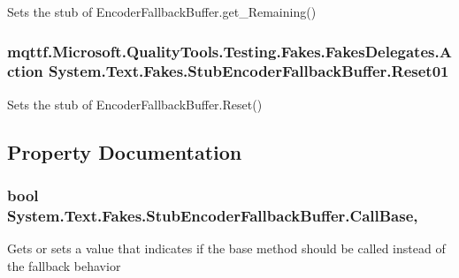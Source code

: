 Sets the stub of Encoder\-Fallback\-Buffer.\-get\-\_\-\-Remaining()

\hypertarget{class_system_1_1_text_1_1_fakes_1_1_stub_encoder_fallback_buffer_a0250622a3fcec719373cb2edc4f24772}{
\subsubsection[{Reset01}]{\setlength{\rightskip}{0pt plus 5cm}mqttf.\-Microsoft.\-Quality\-Tools.\-Testing.\-Fakes.\-Fakes\-Delegates.\-Action System.\-Text.\-Fakes.\-Stub\-Encoder\-Fallback\-Buffer.\-Reset01}}\label{class_system_1_1_text_1_1_fakes_1_1_stub_encoder_fallback_buffer_a0250622a3fcec719373cb2edc4f24772}


Sets the stub of Encoder\-Fallback\-Buffer.\-Reset()



\subsection{Property Documentation}
\hypertarget{class_system_1_1_text_1_1_fakes_1_1_stub_encoder_fallback_buffer_a425db597ba6d77668b8aa155744c2ff2}{
\subsubsection[{Call\-Base}]{\setlength{\rightskip}{0pt plus 5cm}bool System.\-Text.\-Fakes.\-Stub\-Encoder\-Fallback\-Buffer.\-Call\-Base\hspace{0.3cm}{\ttfamily [get]}, {\ttfamily [set]}}}\label{class_system_1_1_text_1_1_fakes_1_1_stub_encoder_fallback_buffer_a425db597ba6d77668b8aa155744c2ff2}


Gets or sets a value that indicates if the base method should be called instead of the fallback behavior

